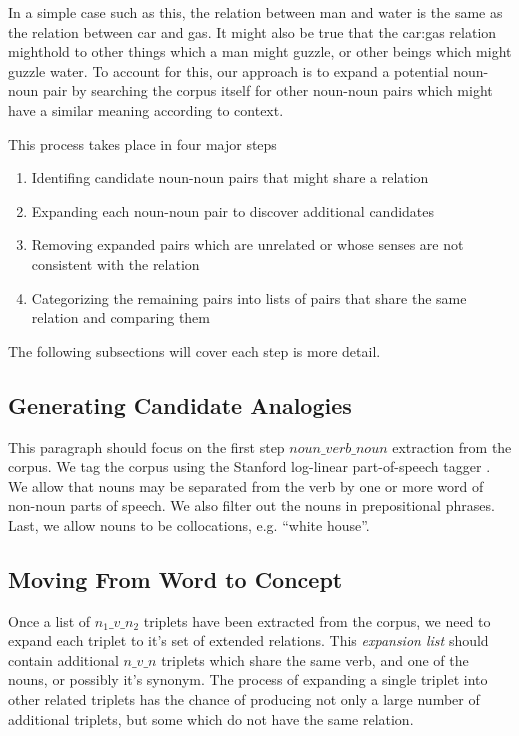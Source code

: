 \documentclass[11pt]{article}
\begin{document}
In a simple case such as this, the relation between man and water is the same as
the relation between car and gas.  It might also be true that the car:gas
relation mighthold to other things which a man might guzzle, or other beings which
might guzzle water.  To account for this, our approach is to expand a potential
noun-noun pair by searching the corpus itself for other noun-noun pairs which
might have a similar meaning according to context.

This process takes place in four major steps
\begin{enumerate}
  \item Identifing candidate noun-noun pairs that might share a relation
  \item Expanding each noun-noun pair to discover additional candidates
  \item Removing expanded pairs which are unrelated or whose senses are not
    consistent with the relation
  \item Categorizing the remaining pairs into lists of pairs that share the same
    relation and comparing them
\end{enumerate}

The following subsections will cover each step is more detail.

\subsection{Generating Candidate Analogies}


This paragraph should focus on the first step $noun\_verb\_noun$ extraction from
the corpus.  We tag the corpus using the Stanford log-linear part-of-speech
tagger \cite{toutanova00enriching}.  We allow that nouns may be separated from the verb by one or
more word of non-noun parts of speech.  We also filter out the nouns in
prepositional phrases.  Last, we allow nouns to be collocations, e.g. ``white
house''.

\subsection{Moving From Word to Concept}

Once a list of $n_1\_v\_n_2$ triplets have been extracted from the corpus, we need to
expand each triplet to it's set of extended relations.  This \emph{expansion
list} should contain additional $n\_v\_n$ triplets which share the same verb,
and one of the nouns, or possibly it's synonym.  The process of expanding a
single triplet into other related triplets has the chance of producing not only
a large number of additional triplets, but some which do not have the same
relation.  
\end{document}
